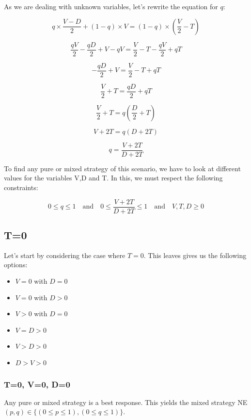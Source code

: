\documentclass[a4paper, 11pt]{article}
\begin{document}
As we are dealing with unknown variables, let's rewrite the equation for $q$:

\[ q \times \frac{V-D}{2} + (1-q) \times V = (1-q) \times ( \frac{V}{2} - T) \]

\[ \frac{qV}{2} - \frac{qD}{2} + V - qV = \frac{V}{2} - T - \frac{qV}{2} + qT \]

\[ - \frac{qD}{2} + V = \frac{V}{2} - T + qT \]

\[ \frac{V}{2} + T = \frac{qD}{2} + qT \]

\[ \frac{V}{2} + T = q( \frac{D}{2} + T) \]

\[ V + 2T = q( D + 2T) \]

\[ q = \frac{V + 2T}{D + 2T} \]

To find any pure or mixed strategy of this scenario, we have to look at different values for the variables V,D and T. In this, we must respect the following constraints:

\[ 0\leq q\leq 1 \quad\mathrm{and}\quad 0 \leq \frac{V + 2T}{D + 2T} \leq 1 \quad\mathrm{and}\quad V,T,D \geq 0 \]

\subsection{T=0}

Let's start by considering the case where $T=0$. This leaves gives us the following options: 
\begin{itemize}[noitemsep]
  \item $V=0$ with $D=0$
  \item $V=0$ with $D>0$
  \item $V>0$ with $D=0$
  \item $V=D>0$
  \item $V>D>0$
  \item $D>V>0$
\end{itemize}

\subsubsection{T=0, V=0, D=0}

Any pure or mixed strategy is a best response. This yields the mixed strategy NE $(p,q) \in \{(0\leq p \leq 1),(0\leq q \leq 1)  \}$.
\end{document}
